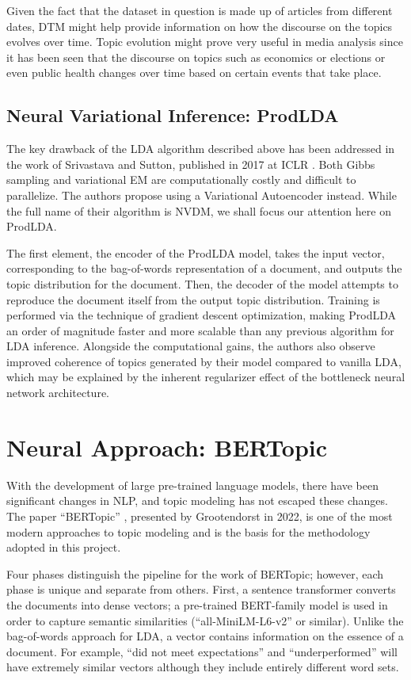 Given the fact that the dataset in question is made up of articles from different dates, DTM might help provide information on how the discourse on the topics evolves over time. Topic evolution might prove very useful in media analysis since it has been seen that the discourse on topics such as economics or elections or even public health changes over time based on certain events that take place.

\subsection{Neural Variational Inference: ProdLDA}
The key drawback of the LDA algorithm described above has been addressed in the work of Srivastava and Sutton, published in 2017 at ICLR \cite{srivastava2017}. Both Gibbs sampling and variational EM are computationally costly and difficult to parallelize. The authors propose using a Variational Autoencoder instead. While the full name of their algorithm is NVDM, we shall focus our attention here on ProdLDA.

The first element, the encoder of the ProdLDA model, takes the input vector, corresponding to the bag-of-words representation of a document, and outputs the topic distribution for the document. Then, the decoder of the model attempts to reproduce the document itself from the output topic distribution. Training is performed via the technique of gradient descent optimization, making ProdLDA an order of magnitude faster and more scalable than any previous algorithm for LDA inference. Alongside the computational gains, the authors also observe improved coherence of topics generated by their model compared to vanilla LDA, which may be explained by the inherent regularizer effect of the bottleneck neural network architecture.

\section{Neural Approach: BERTopic}

With the development of large pre-trained language models, there have been significant changes in NLP, and topic modeling has not escaped these changes. The paper ``BERTopic'' \cite{grootendorst2022}, presented by Grootendorst in 2022, is one of the most modern approaches to topic modeling and is the basis for the methodology adopted in this project.

Four phases distinguish the pipeline for the work of BERTopic; however, each phase is unique and separate from others. First, a sentence transformer \cite{reimers2019} converts the documents into dense vectors; a pre-trained BERT-family model is used in order to capture semantic similarities (``all-MiniLM-L6-v2'' \cite{wang2020} or similar). Unlike the bag-of-words approach for LDA, a vector contains information on the essence of a document. For example, ``did not meet expectations'' and ``underperformed'' will have extremely similar vectors although they include entirely different word sets.

